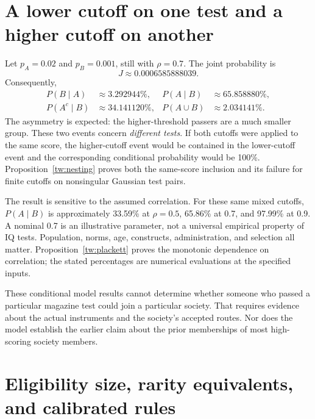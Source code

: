 \section{A lower cutoff on one test and a higher cutoff on another}

Let \(p_A=0.02\) and \(p_B=0.001\), still with \(\rho=0.7\).
The joint probability is
\begin{equation}
J\approx0.0006585888039.
\label{eq:mixed-joint}
\end{equation}
Consequently,
\begin{align}
P(B\mid A)&\approx3.292944\%, &
P(A\mid B)&\approx65.858880\%,\label{eq:mixed-conditionals}\\
P(A^c\mid B)&\approx34.141120\%, &
P(A\cup B)&\approx2.034141\%.\label{eq:mixed-remainder}
\end{align}
The asymmetry is expected: the higher-threshold passers are a much
smaller group. These two events concern \emph{different tests}. If both
cutoffs were applied to the same score, the higher-cutoff event would be
contained in the lower-cutoff event and the corresponding conditional
probability would be 100\%.
Proposition~\ref{tw:nesting} proves both the same-score inclusion and its
failure for finite cutoffs on nonsingular Gaussian test pairs.

The result is sensitive to the assumed correlation. For these same mixed
cutoffs, \(P(A\mid B)\) is approximately 33.59\% at \(\rho=0.5\),
65.86\% at 0.7, and 97.99\% at 0.9. A nominal 0.7 is an illustrative
parameter, not a universal empirical property of IQ tests. Population,
norms, age, constructs, administration, and selection all matter.
Proposition~\ref{tw:plackett} proves the monotonic dependence on correlation;
the stated percentages are numerical evaluations at the specified inputs.

These conditional model results cannot determine whether someone who
passed a particular magazine test could join a particular society.
That requires evidence about the actual instruments and the society's
accepted routes. Nor does the model establish the earlier claim about the
prior memberships of most high-scoring society members.

\section{Eligibility size, rarity equivalents, and calibrated rules}

